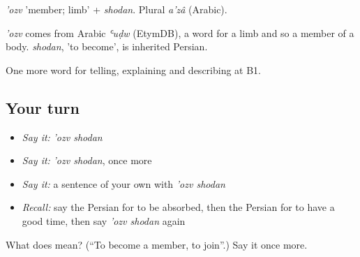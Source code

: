 \emph{'ozv} 'member; limb' + \emph{shodan}. Plural \emph{a'zâ} (Arabic).

\begin{cousinweb}
\emph{'ozv} comes from Arabic \emph{ʿuḍw} (EtymDB), a word for a limb and so a member of a body. \emph{shodan}, 'to become', is inherited Persian.
\end{cousinweb}

\begin{grammarlens}[title={What you've built}]
One more word for telling, explaining and describing at B1.
\end{grammarlens}

\subsection*{Your turn}
\begin{itemize}
\raggedright
  \item \emph{Say it:} \emph{'ozv shodan}
  \item \emph{Say it:} \emph{'ozv shodan}, once more
  \item \emph{Say it:} a sentence of your own with \emph{'ozv shodan}
  \item \emph{Recall:} say the Persian for to be absorbed, then the Persian for to have a good time, then say \emph{'ozv shodan} again
\end{itemize}

\begin{tcolorbox}[breakable,colback=teal!4,colframe=teal!35!black,title={Before you move on}]
What does   mean? (\textquotedblleft{}To become a member, to join\textquotedblright{}.) Say it once more.
\end{tcolorbox}
